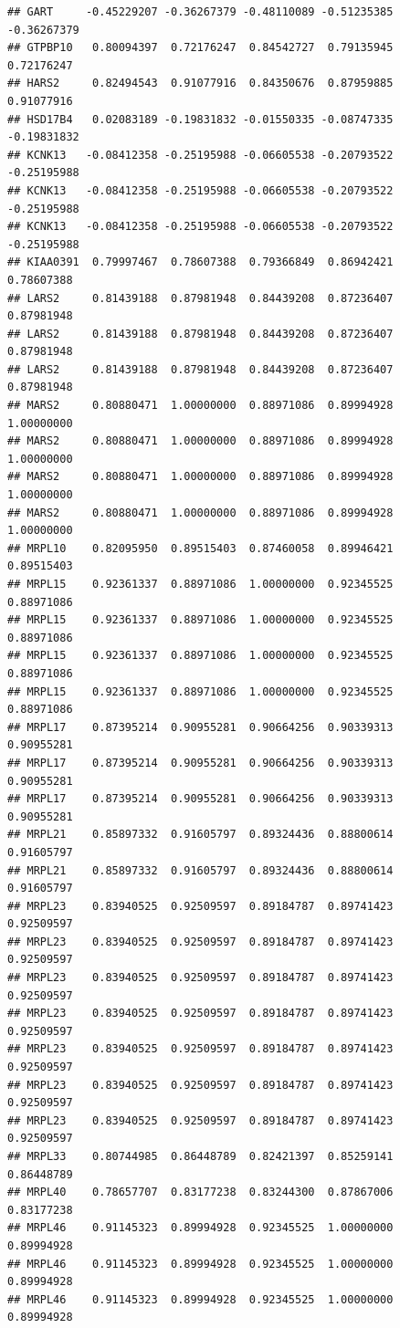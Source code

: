 \documentclass[
]{article}
\begin{document}
\begin{verbatim}
## GART     -0.45229207 -0.36267379 -0.48110089 -0.51235385 -0.36267379
## GTPBP10   0.80094397  0.72176247  0.84542727  0.79135945  0.72176247
## HARS2     0.82494543  0.91077916  0.84350676  0.87959885  0.91077916
## HSD17B4   0.02083189 -0.19831832 -0.01550335 -0.08747335 -0.19831832
## KCNK13   -0.08412358 -0.25195988 -0.06605538 -0.20793522 -0.25195988
## KCNK13   -0.08412358 -0.25195988 -0.06605538 -0.20793522 -0.25195988
## KCNK13   -0.08412358 -0.25195988 -0.06605538 -0.20793522 -0.25195988
## KIAA0391  0.79997467  0.78607388  0.79366849  0.86942421  0.78607388
## LARS2     0.81439188  0.87981948  0.84439208  0.87236407  0.87981948
## LARS2     0.81439188  0.87981948  0.84439208  0.87236407  0.87981948
## LARS2     0.81439188  0.87981948  0.84439208  0.87236407  0.87981948
## MARS2     0.80880471  1.00000000  0.88971086  0.89994928  1.00000000
## MARS2     0.80880471  1.00000000  0.88971086  0.89994928  1.00000000
## MARS2     0.80880471  1.00000000  0.88971086  0.89994928  1.00000000
## MARS2     0.80880471  1.00000000  0.88971086  0.89994928  1.00000000
## MRPL10    0.82095950  0.89515403  0.87460058  0.89946421  0.89515403
## MRPL15    0.92361337  0.88971086  1.00000000  0.92345525  0.88971086
## MRPL15    0.92361337  0.88971086  1.00000000  0.92345525  0.88971086
## MRPL15    0.92361337  0.88971086  1.00000000  0.92345525  0.88971086
## MRPL15    0.92361337  0.88971086  1.00000000  0.92345525  0.88971086
## MRPL17    0.87395214  0.90955281  0.90664256  0.90339313  0.90955281
## MRPL17    0.87395214  0.90955281  0.90664256  0.90339313  0.90955281
## MRPL17    0.87395214  0.90955281  0.90664256  0.90339313  0.90955281
## MRPL21    0.85897332  0.91605797  0.89324436  0.88800614  0.91605797
## MRPL21    0.85897332  0.91605797  0.89324436  0.88800614  0.91605797
## MRPL23    0.83940525  0.92509597  0.89184787  0.89741423  0.92509597
## MRPL23    0.83940525  0.92509597  0.89184787  0.89741423  0.92509597
## MRPL23    0.83940525  0.92509597  0.89184787  0.89741423  0.92509597
## MRPL23    0.83940525  0.92509597  0.89184787  0.89741423  0.92509597
## MRPL23    0.83940525  0.92509597  0.89184787  0.89741423  0.92509597
## MRPL23    0.83940525  0.92509597  0.89184787  0.89741423  0.92509597
## MRPL23    0.83940525  0.92509597  0.89184787  0.89741423  0.92509597
## MRPL33    0.80744985  0.86448789  0.82421397  0.85259141  0.86448789
## MRPL40    0.78657707  0.83177238  0.83244300  0.87867006  0.83177238
## MRPL46    0.91145323  0.89994928  0.92345525  1.00000000  0.89994928
## MRPL46    0.91145323  0.89994928  0.92345525  1.00000000  0.89994928
## MRPL46    0.91145323  0.89994928  0.92345525  1.00000000  0.89994928

\end{verbatim}
\end{document}
